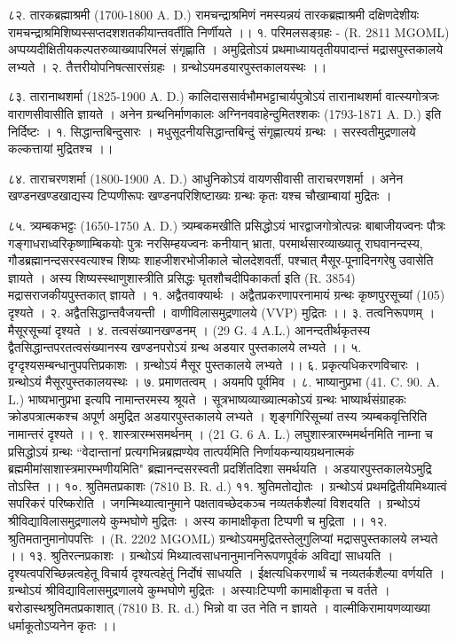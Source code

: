 ८२. तारकब्रह्माश्रमी (1700-1800 A. D.)
रामचन्द्राश्रमिणं नमस्यन्नयं तारकब्रह्माश्रमी दक्षिणदेशीयः रामचन्द्राश्रमिशिष्यस्सप्तदशशतकीयान्तवर्तीति निर्णीयते ।।
१. परिमलसङ्ग्रहः - (R. 2811 MGOML) अप्पय्यदीक्षितीयकल्पतरुव्याख्यापरिमलं संगृह्णाति । अमुद्रितोऽयं प्रथमाध्यायतृतीयपादान्तं मद्रासपुस्तकालये लभ्यते ।
२. तैत्तरीयोपनिषत्सारसंग्रहः । ग्रन्थोऽयमडयारपुस्तकालयस्थः ।।

८३. तारानाथशर्मा (1825-1900 A. D.)
कालिदाससार्वभौमभट्टाचार्यपुत्रोऽयं तारानाथशर्मा वात्स्यगोत्रजः वाराणसीवासीति ज्ञायते । अनेन ग्रन्थनिर्माणकालः अग्निनववाहेन्दुमितश्शकः (1793-1871 A. D.) इति निर्दिष्टः ।
१. सिद्धान्तबिन्दुसारः । मधुसूदनीयसिद्धान्तबिन्दुं संगृह्णात्ययं ग्रन्थः । सरस्वतीमुद्रणालये कल्कत्तायां मुद्रितश्च ।।

८४. ताराचरणशर्मा (1800-1900 A. D.)
आधुनिकोऽयं वायणसीवासी ताराचरणशर्मा । अनेन खण्डनखण्डखाद्यस्य टिप्पणीरूपः खण्डनपरिशिष्टाख्यः ग्रन्थः कृतः यश्च चौखाम्बायां मुद्रितः ।

८५. त्र्यम्बकभट्टः (1650-1750 A. D.)
त्र्यम्बकमखीति प्रसिद्धोऽयं भारद्वाजगोत्रोत्पन्नः बाबाजीयज्वनः पौत्रः गङ्गाधराध्वरिकृष्णाम्बिकयोः पुत्रः नरसिम्हयज्वनः कनीयान् भ्राता, परमार्थसारव्याख्यातू राघवानन्दस्य, गौडब्रह्मानन्दसरस्वत्याश्च शिष्यः शाहजीशरभोजीकाले चोलदेशवर्ती, पश्चात् मैसूर-पूनादिनगरेषु उवासेति ज्ञायते । अस्य शिष्यस्स्थाणुशास्त्रीति प्रसिद्धः घृतशौचदीपिकाकर्ता इति (R. 3854) मद्रासराजकीयपुस्तकात् ज्ञायते ।
१. अद्वैतवाक्यार्थः । अद्वैतप्रकरणापरनामायं ग्रन्थः कृष्णपुरसूच्यां (105) दृश्यते ।
२. अद्वैतसिद्धान्तवैजयन्ती । वाणीविलासमुद्रणालये (VVP) मुद्रितः ।।
३. तत्वनिरूपणम् । मैसूरसूच्यां दृश्यते ।
४. तत्वसंख्यानखण्डनम् । (29 G. 4 A.L.)
आनन्दतीर्थकृतस्य द्वैतसिद्धान्तपरतत्वसंख्यानस्य खण्डनपरोऽयं ग्रन्थ अडयार पुस्तकालये लभ्यते ।।
५. दृग्दृश्यसम्बन्धानुपपत्तिप्रकाशः । ग्रन्थोऽयं मैसूर पुस्तकालये लभ्यते ।।
६. प्रकृत्यधिकरणविचारः । ग्रन्थोऽयं मैसूरपुस्तकालयस्थः ।
७. प्रमाणतत्वम् । अयमपि पूर्वमिव ।
८. भाष्यानुप्रभा (41. C. 90. A. L.)
भाष्यभानुप्रभा इत्यपि नामान्तरमस्य श्रूयते । सूत्रभाष्यव्याख्यात्मकोऽयं ग्रन्थः भाष्यार्थसंग्राहकः क्रोडपत्रात्मकश्च अपूर्ण अमुद्रित अडयारपुस्तकालये लभ्यते । शृङ्गगिरिसूच्यां तस्य त्र्यम्बकवृत्तिरिति नामान्तरं दृश्यते ।।
९. शास्त्रारम्भसमर्थनम् । (21 G. 6 A. L.)
लघुशास्त्रारम्भमर्थनमिति नाम्ना च प्रसिद्धोऽयं ग्रन्थः ``वेदान्तानां प्रत्यगभिन्नब्रह्मण्येव तात्पर्यमिति निर्णायकन्यायग्रथनात्मकं ब्रह्ममीमांसाशास्त्रमारम्भणीयमिति" ब्रह्मानन्दसरस्वती प्रदर्शितदिशा समर्थयति । अडयारपुस्तकालयेऽमुद्रि तोऽस्ति ।।
१०. श्रुतिमतप्रकाशः (7810 B. R. d.)
११. श्रुतिमतोद्योतः । ग्रन्थोऽयं प्रथमद्वितीयमिथ्यात्वं सपरिकरं परिष्करोति । जगन्मिथ्यात्वानुमाने पक्षतावच्छेदकञ्च नव्यतर्कशैल्यां विशदयति । ग्रन्थोऽयं श्रीविद्याविलासमुद्रणालये कुम्भघोणे मुद्रितः । अस्य कामाक्षीकृता टिप्पणी च मुद्रिता ।।
१२. श्रुतिमतानुमानोपपत्तिः । (R. 2202 MGOML) ग्रन्थोऽयममुद्रितस्तेलुगुलिप्यां मद्रासपुस्तकालये लभ्यते ।।
१३. श्रुतिरत्नप्रकाशः । ग्रन्थोऽयं मिथ्यात्वसाधनानुमाननिरूपणपूर्वकं अविद्यां साधयति । दृश्यत्वपरिच्छिन्नत्वहेतू विचार्य दृश्यत्वहेतुं निर्दोषं साधयति । ईक्षत्यधिकरणार्थं च नव्यतर्कशैल्या वर्णयति । ग्रन्थोऽयं श्रीविद्याविलासमुद्रणालये कुम्भघोणे मुद्रितः । अस्याःटिप्पणी कामाक्षीकृता च वर्तते । बरोडास्थश्रुतिमतप्रकाशात् (7810 B. R. d.) भिन्नो वा उत नेति न ज्ञायते । वाल्मीकिरामायणव्याख्या धर्माकूतोऽप्यनेन कृतः ।।

